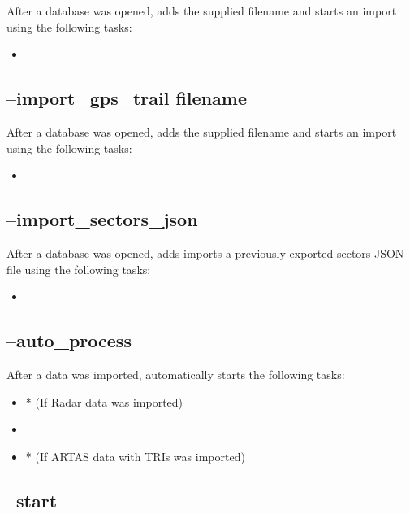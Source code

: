 After a database was opened, adds the supplied filename and starts an import using the following tasks:

\begin{itemize}
 \item {}
\end{itemize}

\subsection{--import\_gps\_trail filename}

After a database was opened, adds the supplied filename and starts an import using the following tasks:

\begin{itemize}
 \item {}
\end{itemize}

\subsection{--import\_sectors\_json}

After a database was opened, adds imports a previously exported sectors JSON file using the following tasks:

\begin{itemize}
 \item {}
\end{itemize}


\subsection{--auto\_process}

After a data was imported, automatically starts the following tasks:

\begin{itemize}
 \item {}* (If Radar data was imported)
 \item {}
 \item {}* (If ARTAS data with TRIs was imported)
\end{itemize}

\subsection{--start}

